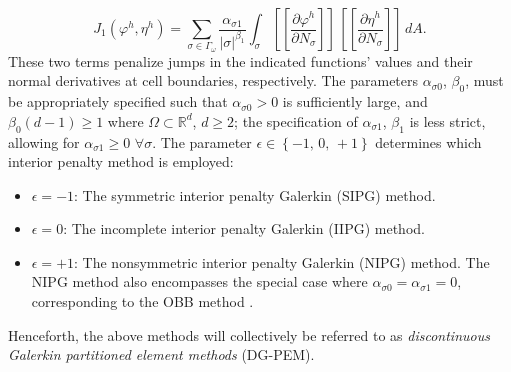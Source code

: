 	\begin{equation}
		J_1 (\varphi^h,\eta^h) = \sum_{\sigma \in \Gamma_\omega} \frac{\alpha_{\sigma1}}{|\sigma|^{\beta_1}} \int_{\sigma} \left[\!\!\left[ \frac{\partial \varphi^h}{\partial N_{\sigma}} \right]\!\!\right] \, \left[\!\!\left[ \frac{\partial \eta^h}{\partial N_{\sigma}} \right]\!\!\right] \, dA.
	\end{equation}
	These two terms penalize jumps in the indicated functions' values and their normal derivatives at cell boundaries, respectively. The parameters $\alpha_{\sigma0}$, $\beta_0$, must be appropriately specified such that $\alpha_{\sigma0} > 0$ is sufficiently large, and $\beta_0 (d-1) \geq 1$ where $\Omega \subset \mathbb{R}^d$, $d \geq 2$; the specification of $\alpha_{\sigma1}$, $\beta_1$ is less strict, allowing for $\alpha_{\sigma1} \geq 0 \, \, \forall \sigma$. The parameter $\epsilon \in \left\{ -1, \, 0, \, +1 \right\}$ determines which interior penalty method is employed:
	\begin{itemize}
		\item[] $\epsilon = -1$: The symmetric interior penalty Galerkin (SIPG) method.
		\item[] $\epsilon = 0$: The incomplete interior penalty Galerkin (IIPG) method.
		\item[] $\epsilon = +1$: The nonsymmetric interior penalty Galerkin (NIPG) method. The NIPG method also encompasses the special case where $\alpha_{\sigma0} = \alpha_{\sigma1} = 0$, corresponding to the OBB method \cite{Oden:98}.
	\end{itemize}
	Henceforth, the above methods will collectively be referred to as \textit{discontinuous Galerkin partitioned element methods} (DG-PEM).
	
